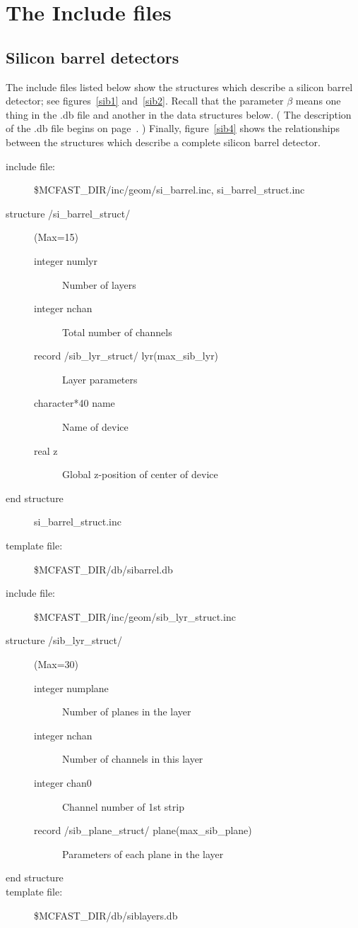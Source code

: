 \newpage
\section{The Include files}

\subsection{Silicon barrel detectors}  
\label{page:sib:include}
The include files listed 
below show the structures which describe a silicon barrel detector;
see figures~\ref{sib1} and~\ref{sib2}.  Recall that the parameter
$\beta$ means one thing in the .db file and another in the
data structures below.  ( The description of the .db file begins
on page~\pageref{page:sib:detectors}. )  Finally, figure~\ref{sib4} shows
the relationships between the structures which describe a complete
silicon barrel detector.


\begin{description}
\item[include file:] \$MCFAST\_DIR/inc/geom/si\_barrel.inc,
si\_barrel\_struct.inc
\item[{\rm structure /si\_barrel\_struct/}] (Max=15)
\begin{description}
\item[{\rm integer}  numlyr] Number of layers
\item[{\rm integer} nchan]   Total number of channels
\item[{\rm record /sib\_lyr\_struct/} lyr(max\_sib\_lyr)] Layer parameters
\item[{\rm character*40} name] Name of device
\item[{\rm real} z] Global z-position of center of device
\end{description}
\item[end structure]
si\_barrel\_struct.inc 
\item[template file:] \$MCFAST\_DIR/db/sibarrel.db
\end{description}


\begin{description}
\item[include file:] \$MCFAST\_DIR/inc/geom/sib\_lyr\_struct.inc 
\item[{\rm structure /sib\_lyr\_struct/}] (Max=30)
\begin{description}
\item[{\rm integer} numplane] Number of planes in the layer
\item[{\rm integer} nchan] Number of channels in this layer
\item[{\rm integer} chan0] Channel number of 1st strip
\item[{\rm record /sib\_plane\_struct/} plane(max\_sib\_plane)]
  Parameters of each plane in the layer
\end{description}
\item[end structure]
\item[template file:] \$MCFAST\_DIR/db/siblayers.db
\end{description}


